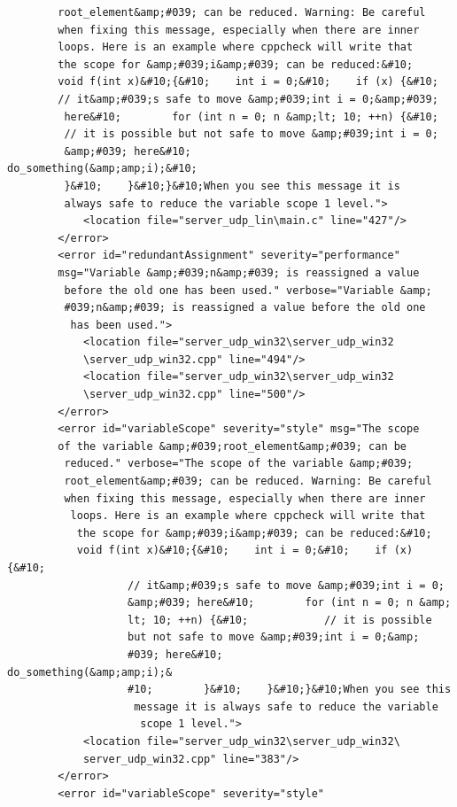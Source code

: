 \documentclass[10pt,a4paper]{report}
\begin{document}
\begin{lstlisting}
        root_element&amp;#039; can be reduced. Warning: Be careful 
        when fixing this message, especially when there are inner 
        loops. Here is an example where cppcheck will write that 
        the scope for &amp;#039;i&amp;#039; can be reduced:&#10;
        void f(int x)&#10;{&#10;    int i = 0;&#10;    if (x) {&#10;        
        // it&amp;#039;s safe to move &amp;#039;int i = 0;&amp;#039;
         here&#10;        for (int n = 0; n &amp;lt; 10; ++n) {&#10;            
         // it is possible but not safe to move &amp;#039;int i = 0;
         &amp;#039; here&#10;            do_something(&amp;amp;i);&#10;        
         }&#10;    }&#10;}&#10;When you see this message it is 
         always safe to reduce the variable scope 1 level.">
            <location file="server_udp_lin\main.c" line="427"/>
        </error>
        <error id="redundantAssignment" severity="performance" 
        msg="Variable &amp;#039;n&amp;#039; is reassigned a value
         before the old one has been used." verbose="Variable &amp;
         #039;n&amp;#039; is reassigned a value before the old one
          has been used.">
            <location file="server_udp_win32\server_udp_win32
            \server_udp_win32.cpp" line="494"/>
            <location file="server_udp_win32\server_udp_win32
            \server_udp_win32.cpp" line="500"/>
        </error>
        <error id="variableScope" severity="style" msg="The scope 
        of the variable &amp;#039;root_element&amp;#039; can be
         reduced." verbose="The scope of the variable &amp;#039;
         root_element&amp;#039; can be reduced. Warning: Be careful
         when fixing this message, especially when there are inner
          loops. Here is an example where cppcheck will write that
           the scope for &amp;#039;i&amp;#039; can be reduced:&#10;
           void f(int x)&#10;{&#10;    int i = 0;&#10;    if (x) {&#10;
                   // it&amp;#039;s safe to move &amp;#039;int i = 0;
                   &amp;#039; here&#10;        for (int n = 0; n &amp;
                   lt; 10; ++n) {&#10;            // it is possible 
                   but not safe to move &amp;#039;int i = 0;&amp;
                   #039; here&#10;            do_something(&amp;amp;i);&
                   #10;        }&#10;    }&#10;}&#10;When you see this
                    message it is always safe to reduce the variable
                     scope 1 level.">
            <location file="server_udp_win32\server_udp_win32\
            server_udp_win32.cpp" line="383"/>
        </error>
        <error id="variableScope" severity="style" 

\end{lstlisting}
\end{document}
